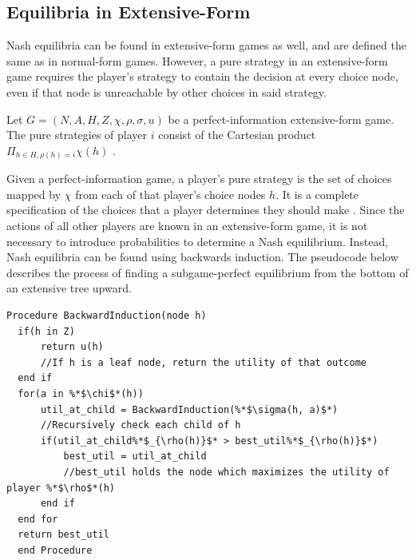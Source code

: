 \subsection{Equilibria in Extensive-Form}
Nash equilibria can be found in extensive-form games as well, and are defined the same as in normal-form games. However, a pure strategy in an extensive-form game requires the player's strategy to contain the decision at every choice node, even if that node is unreachable by other choices in said strategy.\\
\begin{define}
  Let $G = (N, A, H, Z, \chi, \rho, \sigma, u)$ be a perfect-information extensive-form game. The pure strategies of player $i$ consist of the Cartesian product $\Pi_{h\in H, \rho(h)=i}\chi(h)$ \cite{shoh09}.
\end{define}
Given a perfect-information game, a player's pure strategy is the set of choices mapped by $\chi$ from each of that player's choice nodes $h$. It is a complete specification of the choices that a player determines they should make \cite{shoh09}. Since the actions of all other players are known in an extensive-form game, it is not necessary to introduce probabilities to determine a Nash equilibrium. Instead, Nash equilibria can be found using backwards induction. The pseudocode below describes the process of finding a subgame-perfect equilibrium from the bottom of an extensive tree upward.

\begin{lstlisting}[language=pseudocode]
  Procedure BackwardInduction(node h)
  if(h in Z)
      return u(h)
      //If h is a leaf node, return the utility of that outcome
  end if
  for(a in %*$\chi$*(h))
      util_at_child = BackwardInduction(%*$\sigma(h, a)$*)
      //Recursively check each child of h
      if(util_at_child%*$_{\rho(h)}$* > best_util%*$_{\rho(h)}$*)
          best_util = util_at_child
          //best_util holds the node which maximizes the utility of player %*$\rho$*(h)
      end if
  end for
  return best_util
  end Procedure
\end{lstlisting}

